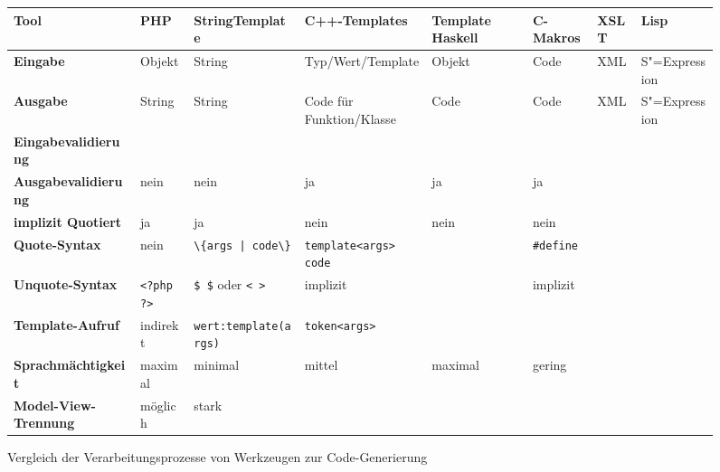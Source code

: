 \documentclass[a4paper, bibgerm]{book}
\newcommand\icode[1]{\lstinline?#1?}
\newcommand\phpo{\lstinline+<?php+}
\newcommand\phpc{\lstinline+?>+}
\newcommand{\sexp}{S"=Expression}
\begin{document}
\begin{figure}
  \centering
\begin{tabular}{|l|l|l|l|l|l|l|l|} \hline
\bf Tool           &\bf PHP        &\bf StringTemplate          &\bf C++-Templates          &\bf Template Haskell&\bf C-Makros&\bf XSLT &\bf Lisp\\\hline\hline
\bf Eingabe            &Objekt         &String                      &Typ/Wert/Template          &Objekt          &Code            &XML      &\sexp{} \\\hline
\bf Ausgabe            &String         &String                      &Code für Funktion/Klasse   &Code            &Code            &XML      &\sexp{} \\\hline
\bf Eingabevalidierung &               &                            &                           &                &                &         &        \\\hline
\bf Ausgabevalidierung &nein           &nein                        &ja                         &ja              &ja              &         &        \\\hline
\bf implizit Quotiert  &ja             &ja                          &nein                       &nein            &nein            &         &        \\\hline
\bf Quote-Syntax       &nein           &\icode{\{args | code\}}     &\icode{template<args> code}&                &\icode{#define} &         &        \\\hline
\bf Unquote-Syntax     &\phpo{} \phpc{}&\icode{$ $} oder \icode{< >}&implizit                   &                &implizit        &         &        \\\hline
\bf Template-Aufruf    &indirekt       &\icode{wert:template(args)} &\icode{token<args>}        &                &                &         &        \\\hline  
\bf Sprachmächtigkeit  &maximal        &minimal                     &mittel                     &maximal         &gering          &         &        \\\hline
\bf Model-View-Trennung&möglich        &stark                       &                           &                &                &         &        \\\hline
\end{tabular}
\caption{Vergleich der Verarbeitungsprozesse von Werkzeugen zur Code-Generierung}
\label{magicl:tab:comp}
\end{figure}
\end{document}
